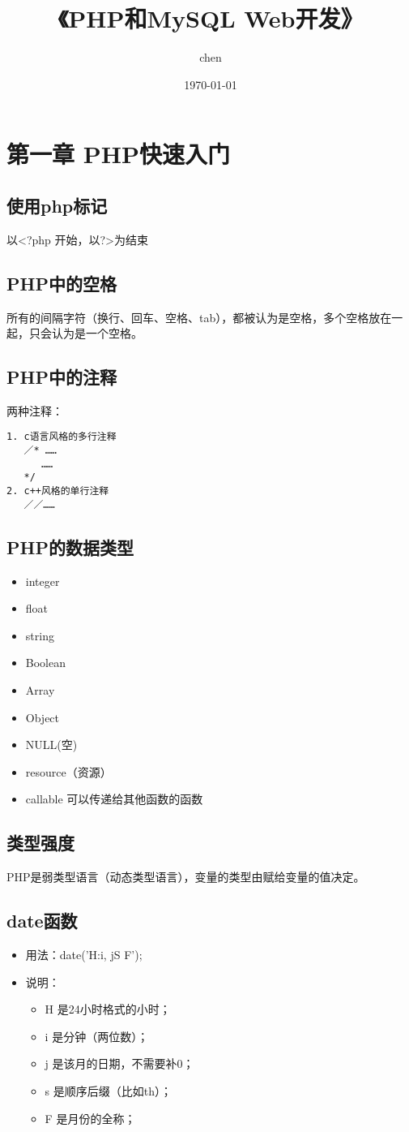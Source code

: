 \documentclass[11pt]{article}
\author{chen}
\date{\today}
\title{《PHP和MySQL Web开发》}
\begin{document}
\maketitle
\tableofcontents

\section{第一章 PHP快速入门}
\label{sec:orgec35205}
\subsection{使用php标记}
\label{sec:orgb3f9089}
以<?php 开始，以?>为结束
\subsection{PHP中的空格}
\label{sec:org9456f85}
所有的间隔字符（换行、回车、空格、tab），都被认为是空格，多个空格放在一起，只会认为是一个空格。
\subsection{PHP中的注释}
\label{sec:orge0b5bcc}
两种注释：
\begin{verbatim}
1. c语言风格的多行注释
   ／* ……
      ……
   */ 
2. c++风格的单行注释
   ／／……
\end{verbatim}
\subsection{PHP的数据类型}
\label{sec:org9b3890a}
\begin{itemize}
\item integer
\item float
\item string
\item Boolean
\item Array
\item Object
\item NULL(空)
\item resource（资源）
\item callable 可以传递给其他函数的函数
\end{itemize}
\subsection{类型强度}
\label{sec:orgc46e5fb}
PHP是弱类型语言（动态类型语言），变量的类型由赋给变量的值决定。
\subsection{date函数}
\label{sec:org61e748f}
\begin{itemize}
\item 用法：date('H:i, jS F');
\item 说明：
\begin{itemize}
\item H 是24小时格式的小时；
\item i 是分钟（两位数）；
\item j 是该月的日期，不需要补0；
\item s 是顺序后缀（比如th）；
\item F 是月份的全称；
\end{itemize}
\end{itemize}
\end{document}
